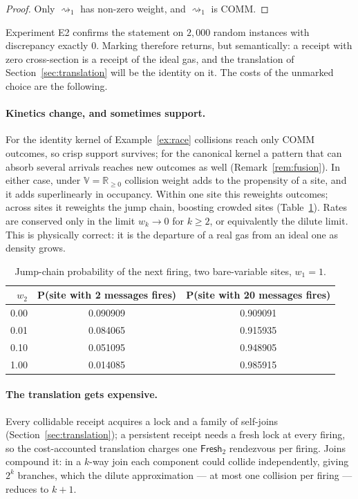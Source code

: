 \documentclass[11pt,a4paper]{article}
\theoremstyle{plain}
\theoremstyle{definition}
\theoremstyle{remark}
\newcommand{\V}{\mathbb{V}}
\newcommand{\Rnn}{\mathbb{R}_{\geq 0}}
\newcommand{\red}{\rightsquigarrow}
\newcommand{\Frsh}{\mathsf{Fresh}_2}
\begin{document}
\begin{proof}
Only $\red_1$ has non-zero weight, and $\red_1$ is COMM.
\end{proof}

Experiment E2 confirms the statement on $2{,}000$ random instances with
discrepancy exactly $0$. Marking therefore returns, but semantically: a
receipt with zero cross-section is a receipt of the ideal gas, and the
translation of Section~\ref{sec:translation} will be the identity on it. The
costs of the unmarked choice are the following.

\paragraph{Kinetics change, and sometimes support.}
For the identity kernel of Example~\ref{ex:race} collisions reach only COMM
outcomes, so crisp support survives; for the canonical kernel a pattern that
can absorb several arrivals reaches new outcomes as well
(Remark~\ref{rem:fusion}). In either case, under $\V=\Rnn$ collision weight
adds to the propensity of a site, and it adds superlinearly in occupancy. Within one site this reweights outcomes; across
sites it reweights the jump chain, boosting crowded sites
(Table~\ref{tab:jump}). Rates are conserved only in the limit $w_k\to0$ for
$k\geq2$, or equivalently the dilute limit. This is physically correct: it is
the departure of a real gas from an ideal one as density grows.

\begin{table}[ht]
\centering
\begin{tabular}{rcc}
\toprule
$w_2$ & P(site with 2 messages fires) & P(site with 20 messages fires)\\
\midrule
0.00 & 0.090909 & 0.909091\\
0.01 & 0.084065 & 0.915935\\
0.10 & 0.051095 & 0.948905\\
1.00 & 0.014085 & 0.985915\\
\bottomrule
\end{tabular}
\caption{Jump-chain probability of the next firing, two bare-variable sites,
$w_1=1$.}
\label{tab:jump}
\end{table}

\paragraph{The translation gets expensive.}
Every collidable receipt acquires a lock and a family of self-joins
(Section~\ref{sec:translation}); a persistent receipt needs a fresh lock at
every firing, so the cost-accounted translation charges one $\Frsh$ rendezvous
per firing. Joins compound it: in a $k$-way join each component could collide
independently, giving $2^k$ branches, which the dilute approximation --- at most
one collision per firing --- reduces to $k+1$.
\end{document}
